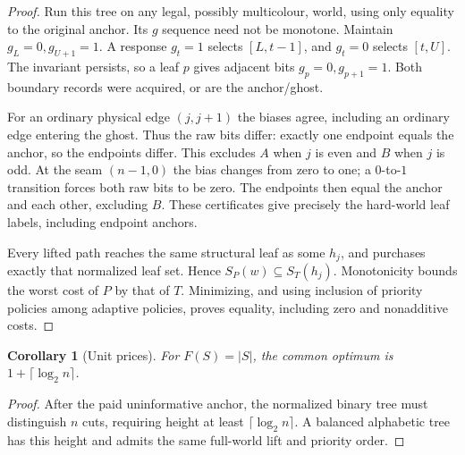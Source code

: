 \documentclass[pdflatex,sn-mathphys-num]{sn-jnl}
\theoremstyle{thmstyleone}
\newtheorem{corollary}[theorem]{Corollary}
\theoremstyle{thmstylethree}
\theoremstyle{thmstyletwo}
\begin{document}
\begin{proof}
Run this tree on any legal, possibly multicolour, world, using only equality to the original anchor. Its $g$ sequence need not be monotone. Maintain $g_L=0,g_{U+1}=1$. A response $g_t=1$ selects $[L,t-1]$, and $g_t=0$ selects $[t,U]$. The invariant persists, so a leaf $p$ gives adjacent bits $g_p=0,g_{p+1}=1$. Both boundary records were acquired, or are the anchor/ghost.

For an ordinary physical edge $(j,j+1)$ the biases agree, including an ordinary edge entering the ghost. Thus the raw bits differ: exactly one endpoint equals the anchor, so the endpoints differ. This excludes $A$ when $j$ is even and $B$ when $j$ is odd. At the seam $(n-1,0)$ the bias changes from zero to one; a $0$-to-$1$ transition forces both raw bits to be zero. The endpoints then equal the anchor and each other, excluding $B$. These certificates give precisely the hard-world leaf labels, including endpoint anchors.

Every lifted path reaches the same structural leaf as some $h_j$, and purchases exactly that normalized leaf set. Hence $S_P(w)\subseteq S_T(h_j)$. Monotonicity bounds the worst cost of $P$ by that of $T$. Minimizing, and using inclusion of priority policies among adaptive policies, proves equality, including zero and nonadditive costs.
\end{proof}

\begin{corollary}[Unit prices]\label{cor:record-path-unit}
For $F(S)=|S|$, the common optimum is $1+\lceil\log_2 n\rceil$.
\end{corollary}
\begin{proof}
After the paid uninformative anchor, the normalized binary tree must distinguish $n$ cuts, requiring height at least $\lceil\log_2 n\rceil$. A balanced alphabetic tree has this height and admits the same full-world lift and priority order.
\end{proof}
\end{document}
